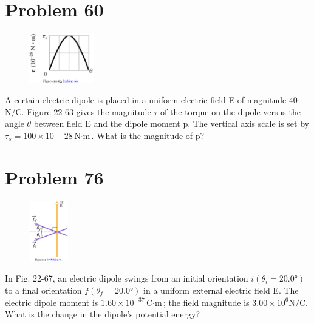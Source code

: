 \documentclass[12pt]{article}
\begin{document}
\section{Problem 60}
\begin{figure}
    \vspace{-30pt}
    \includegraphics[width=0.25\textwidth]{picture_5.png} 
\end{figure}
A certain electric dipole is placed in a uniform electric field E of magnitude 40 N/C. Figure 22-63 gives the magnitude $\tau$ of the torque on the dipole versus the angle $\theta$ between field E and the dipole moment p. The vertical axis scale is set by $\tau_s = 100 \times 10-28 \unit{\newton\cdot\meter}$. What is the magnitude of p?

\section{Problem 76}
\begin{figure}
    \vspace{-30pt}
    \includegraphics[width=0.15\textwidth]{picture_6.png} 
\end{figure}
In Fig. 22-67, an electric dipole swings from an initial orientation $i (\theta_i = 20.0\unit{\degree})$ to a final orientation $f (\theta_f= 20.0\unit{\degree})$ in a uniform external electric field E. The electric dipole moment is $1.60 \times 10^{-37} \unit{\coulomb\cdot\meter}$; the field magnitude is $3.00 \times 10^6 \unit{\newton/\coulomb}$. What is the change in the dipole's potential energy?
\end{document}
